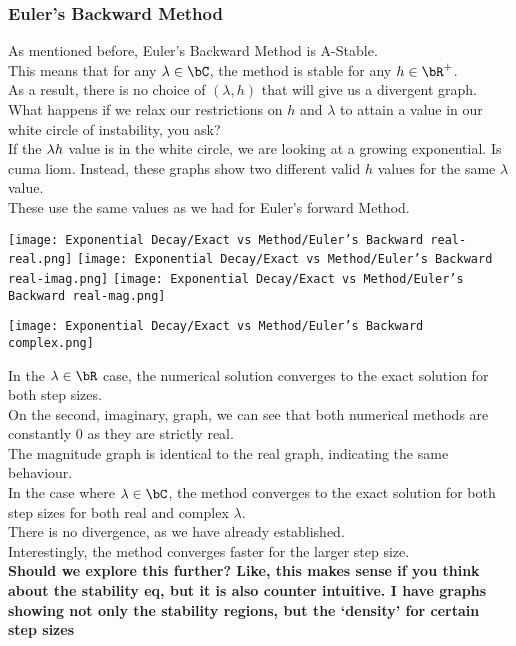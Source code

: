 \subsubsection{Euler's Backward Method}
As mentioned before, Euler's Backward Method is A-Stable.\\
This means that for any $\lambda \in \bC$, the method is stable for any $h \in \bR^{+}$.\\
As a result, there is no choice of $(\lambda, h)$ that will give us a divergent graph.\\
What happens if we relax our restrictions on $h$ and $\lambda$ to attain a value in our white circle of instability, you ask?\\
If the $\lambda h$ value is in the white circle, we are looking at a growing exponential.
Is cuma liom.
Instead, these graphs show two different valid $h$ values for the same $\lambda$ value.\\
These use the same values as we had for Euler's forward Method.\\
\begin{multicols}{2}
\begin{center}
	\texttt{[image: Exponential Decay/Exact vs Method/Euler's Backward real-real.png]}
	\texttt{[image: Exponential Decay/Exact vs Method/Euler's Backward real-imag.png]}
	\texttt{[image: Exponential Decay/Exact vs Method/Euler's Backward real-mag.png]}
\end{center}
\columnbreak{}
\begin{center}
	\texttt{[image: Exponential Decay/Exact vs Method/Euler's Backward complex.png]}
\end{center}
	In the $\lambda \in \bR$ case, the numerical solution converges to the exact solution for both step sizes.\\
	On the second, imaginary, graph, we can see that both numerical methods are constantly $0$ as they are strictly real.\\
	The magnitude graph is identical to the real graph, indicating the same behaviour.\\
	In the case where $\lambda \in \bC$, the method converges to the exact solution for both step sizes for both real and complex $\lambda$.\\
	There is no divergence, as we have already established.\\
	Interestingly, the method converges faster for the larger step size.\\
	\textbf{Should we explore this further? Like, this makes sense if you think about the stability eq, but it is also counter intuitive. I have graphs showing not only the stability regions, but the `density' for certain step sizes\ellipsis}
\end{multicols}
